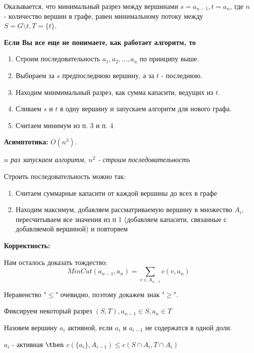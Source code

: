  Оказывается, что минимальный разрез между вершинами $s = a_{n-1}, t = a_n$, где $n$ - количество вершин в графе, равен минимальному потоку между $S = G \setminus t, T = \{t\}$. 

 \textbf{Если Вы все еще не понимаете, как работает алгоритм, то}

\begin{enumerate}
  \item Строим последовательность $a_1, a_2, \dots, a_n$ по принципу выше.
  \item Выбираем за $s$ предпоследнюю вершину, а за $t$ - последнюю.
  \item Находим минмимальный разрез, как сумма капасити, ведущих из $t$. 
  \item Сливаем $s$ и $t$ в одну вершину и запускаем алгоритм для нового графа. 
  \item Считаем минимум из п. 3 и п. 4
\end{enumerate}

\textbf{Асимптотика:} $O(n^3)$. 

\textit{$n$ раз запускаем алгоритм, $n^2$ - строим последовательность}

Строить последовательность можно так:
\begin{enumerate}
  \item Считаем суммарные капасити от каждой вершины до всех в графе
  \item Находим максимум, добавляем рассматриваемую вершину в множество $A_i$, пересчитываем все значения из п 1 (добавляем капасити, связанные с добавляемой вершиной) и повторяем
\end{enumerate}

\textbf{Корректность:}

Нам осталось доказать тождество:
$$MinCut(a_{n-1}, a_n) = \sum_{v \in A_{n-1}}c(v, a_n)$$

Неравенство "$\le$" очевидно, поэтому докажем знак "$\ge$". 

Фиксируем некоторый разрез $(S, T), a_{n-1} \in S, a_n \in T$

\begin{proposition}
  Назовем вершину $a_i$ активной, если $a_i$ и $a_{i - 1}$ не содержатся в одной доли.
\end{proposition}

\begin{lemma}
  $a_i$ - активная $\then$ $c(\{a_i\}, A_{i-1}) \le c(S \cap A_i, T \cap A_i)$
 \end{lemma}

